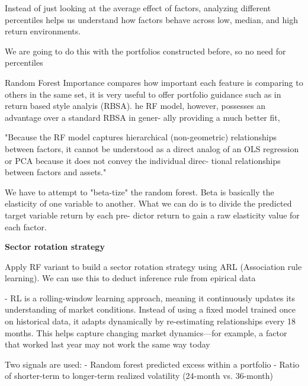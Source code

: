 Instead of just looking at the average effect of factors, analyzing different percentiles helps us understand how factors behave across low, median, and high return environments.

We are going to do this with the portfolios constructed before, so no need for percentiles


Random Forest Importance compares how important each feature is comparing to others in the same set, it is very useful to offer portfolio guidance such as in  return based style analyis (RBSA). he RF model, however,
possesses an advantage over a standard RBSA in gener-
ally providing a much better fit,

"Because the RF model captures hierarchical
(non-geometric) relationships between factors, it cannot
be understood as a direct analog of an OLS regression
or PCA because it does not convey the individual direc-
tional relationships between factors and assets."

We have to attempt to "beta-tize" the random forest. Beta is basically the elasticity of one variable to another. What we can do is to divide the predicted target variable return by each pre-
dictor return to gain a raw elasticity value for each factor.

\textbf{Sector rotation strategy}

Apply RF variant to build a sector rotation strategy using ARL (Association rule learning). We can use this to deduct inference rule from epirical data

- RL is a rolling-window learning approach, meaning it continuously updates its understanding of market conditions.
Instead of using a fixed model trained once on historical data, it adapts dynamically by re-estimating relationships every 18 months.
This helps capture changing market dynamics—for example, a factor that worked last year may not work the same way today

Two signals are used:
- Random forest predicted excess within a portfolio
- Ratio of shorter-term to longer-term realized volatility (24-month vs. 36-month)